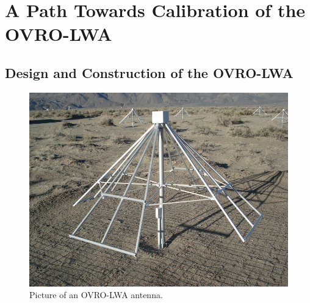 \chapter{A Path Towards Calibration of the OVRO-LWA}
\label{chapter2}

\begin{bibunit}

\section{Design and Construction of the OVRO-LWA}

\begin{figure}[t]
    \centering
    \includegraphics[width=\textwidth]{figures/chapter2/lwa-antenna}
    \caption{
        Picture of an OVRO-LWA antenna.
    }
    \label{fig:ovro-lwa-pictures}
\end{figure}


\end{bibunit}

